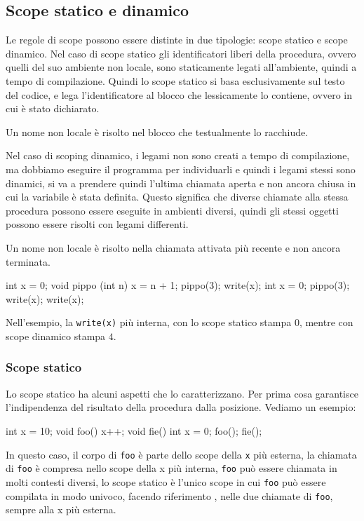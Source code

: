 \documentclass[oneside,a4paper,11pt]{book}
\theoremstyle{italicstyle}
\theoremstyle{normStyle}
\begin{document}
\subsection{Scope statico e dinamico}
Le regole di scope possono essere distinte in due tipologie: scope statico e scope dinamico. 
Nel caso di scope statico gli identificatori liberi della procedura, ovvero 
quelli del suo ambiente non locale, sono staticamente legati all'ambiente, quindi a tempo di compilazione.
Quindi lo scope statico si basa esclusivamente sul testo del codice, e lega 
l'identificatore al blocco che lessicamente lo contiene, ovvero in cui è stato dichiarato.
\begin{tcolorbox}[title = {Scope statico}]
  Un nome non locale è risolto nel blocco che testualmente lo racchiude.
\end{tcolorbox}
Nel caso di scoping dinamico, i legami non sono creati a tempo di compilazione, 
ma dobbiamo eseguire il programma per individuarli e quindi i legami stessi sono dinamici, 
si va a prendere quindi l'ultima chiamata aperta e non ancora chiusa in cui la variabile 
è stata definita. Questo significa che diverse chiamate alla stessa procedura possono 
essere eseguite in ambienti diversi, quindi gli stessi oggetti possono essere risolti 
con legami differenti.
\begin{tcolorbox}[title = {Scope dinamico}]
  Un nome non locale è risolto nella chiamata attivata più recente e non ancora terminata.
\end{tcolorbox}
\begin{algorithm}
  { int x = 0;
    void pippo (int n) {
      x = n + 1;
    }
    pippo(3);
    write(x);
      { int x = 0;
        pippo(3);
        write(x);
      }
    write(x);
  }
\end{algorithm}
Nell'esempio, la \verb|write(x)| più interna, con lo scope statico stampa $0$, 
mentre con scope dinamico stampa $4$.
\subsubsection{Scope statico}
Lo scope statico ha alcuni aspetti che lo caratterizzano. Per prima cosa garantisce l'indipendenza del 
risultato della procedura dalla posizione. Vediamo un esempio:
\begin{algorithm}
  { int x = 10;
    void foo() {
      x++;
    }
    void fie() {
      int x = 0;
      foo();
    }
    fie();
  }
\end{algorithm}
In questo caso, il corpo di \verb|foo| è parte dello scope della \verb|x| 
più esterna, la chiamata di \verb|foo| è compresa nello scope della x più interna,
\verb|foo| può essere chiamata in molti contesti diversi, lo scope statico è l'unico scope in cui \verb|foo|
può essere compilata in modo univoco, facendo riferimento , nelle due chiamate di \verb|foo|,
sempre alla x più esterna.
\end{document}

